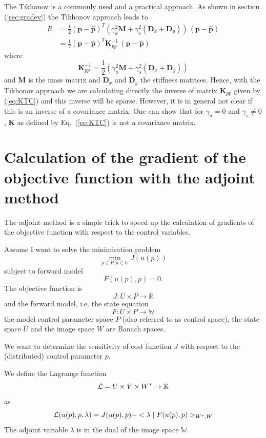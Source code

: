 \documentclass[10pt,a4paper]{book}
\begin{document}
The Tikhonov is a commonly used and a practical approach. As shown in
section (\ref{sec:gradev}) the Tikhonov approach leads to
\begin{align}
R  &= \frac{1}{2} (\bm{p}-\hat{\bm{p}})^T \left ( \gamma_a^2 \bm{M}  +  \gamma_s^2 (\bm{D}_x + \bm{D}_y) \right ) \, ( \bm{p}-\hat{\bm{p}}) \\
   &= \frac{1}{2} (\bm{p}-\hat{\bm{p}})^T \bm{K}^{-1}_{pp} \, ( \bm{p}-\hat{\bm{p}})
\end{align}
where
\begin{equation}
\bm{K}^{-1}_{pp} = \frac{1}{2}  \left ( \gamma_a^2 \bm{M} +  \gamma^2_s(\bm{D}_x + \bm{D}_y) \right )
\label{eq:KTC}
\end{equation}
and $\bm{M}$ is the mass matrix and $\bm{D}_x$ and $\bm{D}_y$ the
stiffness matrices. Hence, with the Tikhonov approach we are
calculating directly the inverse of matrix $\bm{K}_{pp}$ given by
(\ref{eq:KTC}) and this inverse will be sparse. However, it is in
general not clear if this is an inverse of a covariance matrix. One
can show that for $\gamma_a=0$ and $\gamma_s\neq 0$, $\bm{K}$ as
defined by Eq.~(\ref{eq:KTC}) is not a covariance matrix.  


\section{Calculation of the gradient of the objective function with the adjoint method}


The adjoint method is a simple trick to speed up the calculation of
gradients of the objective function with respect to the control variables. 

Assume I want to solve the minimisation problem
\[
\min_{p \in P, u \in U } J(u(p)) 
\]
subject to forward model
\[     
F(u(p),p)=0.
\]
The objective function is
\[
J : U \times P \to \mathbb{R}
\]
and the forward model, i.e. the state equation
\[
F : U \times P \to \mathbb{W}
\]
the model control parameter space $P$ (also referred to as control space), the
state space $U$ and the image space $W$ are Banach spaces.



We want to determine the sensitivity of cost function $J$ with respect
to the (distributed) control parameter $p$. 



We define the Lagrange function 
\[
{\cal L}= U \times V \times W^\ast \to \mathbb{R} 
\]
as
\begin{equation} 
{\cal L}(u(p),p,\lambda)=J(u(p),p)+<\lambda \mid F(u(p),p) >_{W^\ast ,W}
\label{eq:L1}
\end{equation}
The adjoint variable $\lambda$ is in the dual of the image space $\mathbb{W}$.
\end{document}
